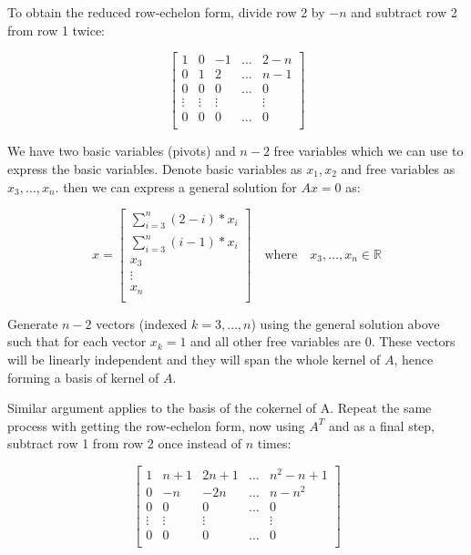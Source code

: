 \documentclass[10pt,letter]{article}
\newcommand{\R}{\mathbb{R}}
\begin{document}
To obtain the reduced row-echelon form, divide row 2 by $-n$ and subtract row 2 from row 1 twice:


\[
\left[ {\begin{array}{ccccc}
 1 & 0 & -1 & \ldots & 2 - n \\
 0 & 1 & 2 & \ldots & n - 1 \\
 0 & 0 & 0 &\ldots & 0 \\
 \vdots & \vdots & \vdots &  & \vdots \\
 0 & 0 & 0 &\ldots & 0 \\
\end{array} } \right]
\]

We have two basic variables (pivots) and $n-2$ free variables which we can use to express the basic variables. Denote basic variables as $x_1, x_2$ and free variables as $x_3, \ldots, x_n$. then we can express a general solution for $Ax = 0$ as:

\[
x =
\left[ {\begin{array}{c}
  \sum_{i=3}^{n}(2 - i) * x_i \\
  \sum_{i=3}^{n}(i - 1) * x_i \\
  x_3 \\
  \vdots \\
  x_n \\
\end{array} } \right]
\quad \textrm{where} \quad x_3, \ldots, x_n \in \R
\]

Generate $n-2$ vectors (indexed $k = 3, \ldots, n$) using the general solution above such that for each vector $x_k = 1$ and all other free variables are $0$. These vectors will be linearly independent and they will span the whole kernel of $A$, hence forming a basis of kernel of $A$.

Similar argument applies to the basis of the cokernel of A. Repeat the same process with getting the row-echelon form, now using $A^T$ and as a final step, subtract row 1 from row 2 once instead of $n$ times:

\[
\left[ {\begin{array}{ccccc}
 1 & n + 1 & 2n + 1  & \ldots & n^2 - n + 1 \\
 0 & -n & -2n & \ldots & n - n^2 \\
 0 & 0 & 0 &\ldots & 0 \\
 \vdots & \vdots & \vdots &  & \vdots \\
 0 & 0 & 0 & \ldots & 0 \\
\end{array} } \right]
\]
\end{document}
